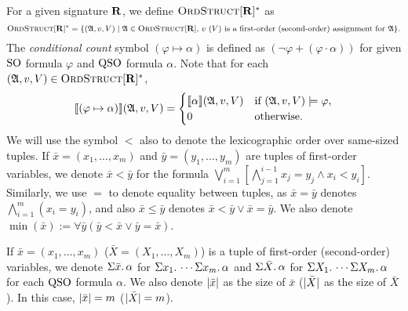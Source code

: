 For a given signature $\mathbf{R}$, we define $\text{\sc OrdStruct}[\mathbf{R}]^*$ as $$\text{\sc OrdStruct}[\mathbf{R}]^* = \{(\mathfrak{A},v,V) \mid \mathfrak{A}\in\text{\sc OrdStruct}[\mathbf{R}]\text{, $v$ ($V$) is a first-order (second-order) assignment for $\mathfrak{A}$}  \}.$$
The {\em conditional count} symbol $(\varphi \mapsto \alpha)$ is defined as $(\neg\varphi + (\varphi\cdot\alpha))$ for given ${\rm SO}$ formula $\varphi$ and ${\rm QSO}$ formula $\alpha$. Note that for each $(\mathfrak{A},v,V) \in \text{\sc OrdStruct}[\mathbf{R}]^*$, 
$$
{\llbracket{}{(\varphi \mapsto \alpha)}\rrbracket}(\mathfrak{A},v,V) = 
\begin{cases}
{\llbracket{}{\alpha}\rrbracket}(\mathfrak{A},v,V) &\text{if } (\mathfrak{A},v,V)\models\varphi,\\
0 &\text{otherwise}.
\end{cases}
$$
We will use the symbol $<$ also to denote the lexicographic order over same-sized tuples. If $\bar{x} = (x_1,\ldots,x_m)$ and $\bar{y} = (y_1,\ldots,y_m)$ are tuples of first-order variables, we denote $\bar{x} < \bar{y}$ for the formula $\bigvee_{i = 1}^m[\bigwedge_{j = 1}^{i-1}x_j = y_j \wedge x_i < y_i]$. Similarly, we use $=$ to denote equality between tuples, as $\bar{x} = \bar{y}$ denotes $\bigwedge_{i = 1}^m(x_i = y_i)$, and also $\bar{x}\leq\bar{y}$ denotes $\bar{x} < \bar{y} \vee \bar{x} = \bar{y}$. We also denote $\min(\bar{x}) := \forall\bar{y}(\bar{y} < \bar{x}\vee \bar{y} = \bar{x})$.

If $\bar{x} = (x_1,\ldots,x_m)$ ($\bar{X} = (X_1,\ldots,X_m)$) is a tuple of first-order (second-order) variables, we denote $\Sigma{\bar{x}}.\,\alpha$ for $\Sigma{x_1}.\,\cdots\Sigma{x_m}.\,\alpha$ and $\Sigma{\bar{X}}.\,\alpha$ for $\Sigma{X_1}.\,\cdots\Sigma{X_m}.\,\alpha$ for each ${\rm QSO}$ formula $\alpha$. We also denote $\vert \bar{x} \vert$ as the size of $\bar{x}$ ($\vert \bar{X} \vert$ as the size of $\bar{X}$). In this case, $\vert \bar{x} \vert = m$ ($\vert \bar{X} \vert = m$).